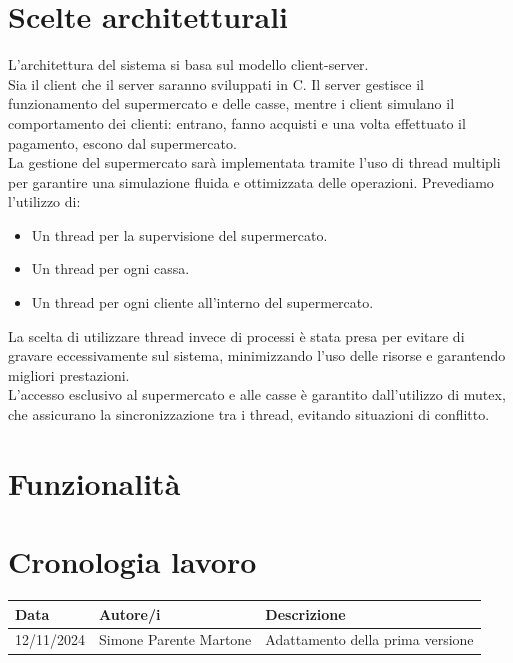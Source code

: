 \documentclass[a4paper, 12pt]{article}
\begin{document}
\section{Scelte architetturali}
L'architettura del sistema si basa sul modello client-server. \\
Sia il client che il server saranno sviluppati in C. Il server gestisce il
funzionamento del supermercato e delle casse, mentre i client simulano il 
comportamento dei clienti: entrano, fanno acquisti e una volta effettuato il 
pagamento, escono dal supermercato. \\
La gestione del supermercato sarà implementata tramite l'uso di thread multipli
per garantire una simulazione fluida e ottimizzata delle operazioni.
Prevediamo l'utilizzo di:
\begin{itemize}[noitemsep,topsep=0pt,parsep=0pt,partopsep=0pt]
    \item Un thread per la supervisione del supermercato.
    \item Un thread per ogni cassa.
    \item Un thread per ogni cliente all'interno del supermercato.
\end{itemize}

La scelta di utilizzare thread invece di processi è stata presa per evitare di
gravare eccessivamente sul sistema, minimizzando l'uso delle risorse e garantendo
migliori prestazioni. \\
L'accesso esclusivo al supermercato e alle casse è garantito dall'utilizzo di 
mutex, che assicurano la sincronizzazione tra i thread, evitando situazioni di
conflitto.
\section{Funzionalità}

\section{Cronologia lavoro}

\begin{center}
    \begin{tabular}{lll}
        \hline
        \textbf{Data} & \textbf{Autore/i} & \textbf{Descrizione} \\
        \hline
        12/11/2024 & Simone Parente Martone & Adattamento della prima versione \\
        \hline
    \end{tabular}
    \end{center}
\end{document}
